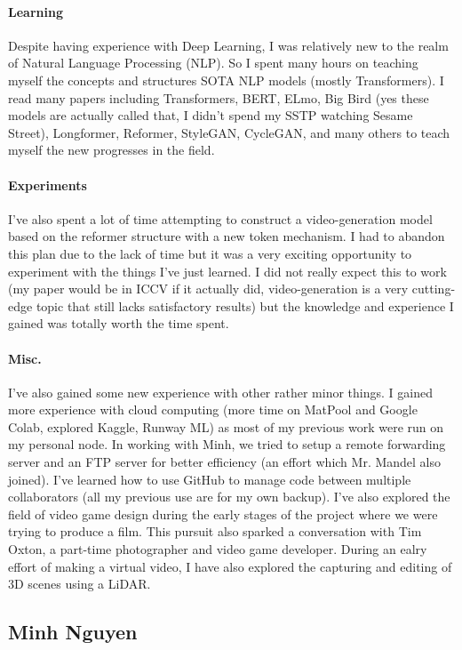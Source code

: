 \documentclass[12pt, letterpaper]{article}
\begin{document}
\paragraph{Learning}Despite having experience with Deep Learning, I was relatively new to the realm of Natural Language Processing (NLP). So I spent many hours on teaching myself the concepts and structures SOTA NLP models (mostly Transformers). I read many papers including Transformers, BERT, ELmo, Big Bird (yes these models are actually called that, I didn't spend my SSTP watching Sesame Street), Longformer, Reformer, StyleGAN, CycleGAN, and many others to teach myself the new progresses in the field.

\paragraph{Experiments}I've also spent a lot of time attempting to construct a video-generation model based on the reformer structure with a new token mechanism. I had to abandon this plan due to the lack of time but it was a very exciting opportunity to experiment with the things I've just learned. I did not really expect this to work (my paper would be in ICCV if it actually did, video-generation is a very cutting-edge topic that still lacks satisfactory results) but the knowledge and experience I gained was totally worth the time spent.

\paragraph{Misc.}I've also gained some new experience with other rather minor things. I gained more experience with cloud computing (more time on MatPool and Google Colab, explored Kaggle, Runway ML) as most of my previous work were run on my personal node. In working with Minh, we tried to setup a remote forwarding server and an FTP server for better efficiency (an effort which Mr. Mandel also joined). I've learned how to use GitHub to manage code between multiple collaborators (all my previous use are for my own backup). I've also explored the field of video game design during the early stages of the project where we were trying to produce a film. This pursuit also sparked a conversation with Tim Oxton, a part-time photographer and video game developer. During an ealry effort of making a virtual video, I have also explored the capturing and editing of 3D scenes using a LiDAR.


\subsection{Minh Nguyen}
\end{document}
